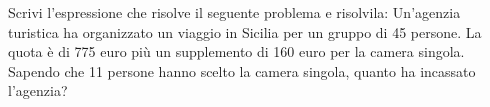 \item Scrivi l'espressione che risolve il seguente problema e risolvila: Un'agenzia turistica ha organizzato un viaggio in Sicilia per un gruppo di 45 persone. La quota è di 775 euro più un supplemento di 160 euro per la camera singola. Sapendo che 11 persone hanno scelto la camera singola, quanto ha incassato l'agenzia?
